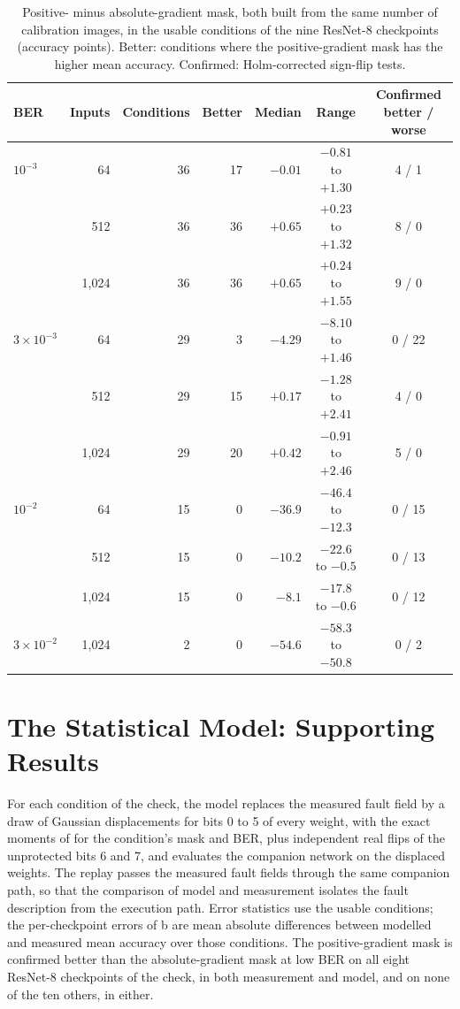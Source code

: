 \begin{table}[h]
\caption{Positive- minus absolute-gradient mask, both built from the same number of calibration images, in the usable conditions of the nine ResNet-8 checkpoints (accuracy points). Better: conditions where the positive-gradient mask has the higher mean accuracy. Confirmed: Holm-corrected sign-flip tests.}\label{tab:calibration}
\centering\footnotesize
\begin{tabular}{l r r r r c c}\toprule
BER & Inputs & Conditions & Better & Median & Range & Confirmed better / worse\\\midrule
$10^{-3}$ & 64 & 36 & 17 & $-0.01$ & $-0.81$ to $+1.30$ & 4 / 1\\
 & 512 & 36 & 36 & $+0.65$ & $+0.23$ to $+1.32$ & 8 / 0\\
 & 1,024 & 36 & 36 & $+0.65$ & $+0.24$ to $+1.55$ & 9 / 0\\\midrule
$3\times10^{-3}$ & 64 & 29 & 3 & $-4.29$ & $-8.10$ to $+1.46$ & 0 / 22\\
 & 512 & 29 & 15 & $+0.17$ & $-1.28$ to $+2.41$ & 4 / 0\\
 & 1,024 & 29 & 20 & $+0.42$ & $-0.91$ to $+2.46$ & 5 / 0\\\midrule
$10^{-2}$ & 64 & 15 & 0 & $-36.9$ & $-46.4$ to $-12.3$ & 0 / 15\\
 & 512 & 15 & 0 & $-10.2$ & $-22.6$ to $-0.5$ & 0 / 13\\
 & 1,024 & 15 & 0 & $-8.1$ & $-17.8$ to $-0.6$ & 0 / 12\\\midrule
$3\times10^{-2}$ & 1,024 & 2 & 0 & $-54.6$ & $-58.3$ to $-50.8$ & 0 / 2\\\bottomrule
\end{tabular}
\end{table}

\section{The Statistical Model: Supporting Results}\label{app:model}
For each condition of the check, the model replaces the measured fault field by a draw of Gaussian displacements for bits 0 to 5 of every weight, with the exact moments of  for the condition's mask and BER, plus independent real flips of the unprotected bits 6 and 7, and evaluates the companion network on the displaced weights. The replay passes the measured fault fields through the same companion path, so that the comparison of model and measurement isolates the fault description from the execution path. Error statistics use the usable conditions; the per-checkpoint errors of b are mean absolute differences between modelled and measured mean accuracy over those conditions. The positive-gradient mask is confirmed better than the absolute-gradient mask at low BER on all eight ResNet-8 checkpoints of the check, in both measurement and model, and on none of the ten others, in either.

